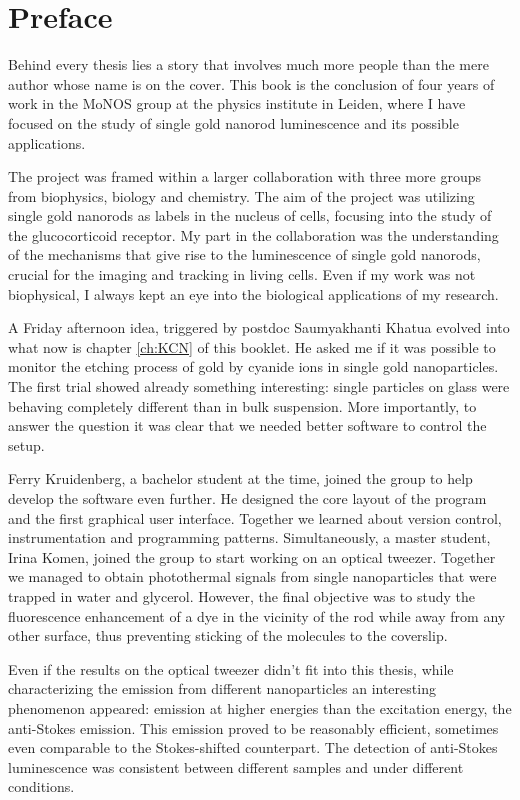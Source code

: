 \chapter*{Preface}

Behind every thesis lies a story that involves much more people than the
mere author whose name is on the cover. This book is the conclusion of four years of
work in the MoNOS group at the physics institute in Leiden, where I have focused
on the study of single gold nanorod luminescence and its possible applications. 

The project was framed within a larger collaboration with three more groups from
biophysics, biology and chemistry. The aim of the project was utilizing single
gold nanorods as labels in the nucleus of cells, focusing into the study of the
glucocorticoid receptor. My part in the collaboration was the understanding of
the mechanisms that give rise to the luminescence of single gold nanorods,
crucial for the imaging and tracking in living cells. Even if my work was not
biophysical, I always kept an eye into the biological applications of my
research.

A Friday afternoon idea, triggered by postdoc Saumyakhanti Khatua evolved into
what now is chapter \ref{ch:KCN} of this booklet. He asked me if it was possible
to monitor the etching process of gold by cyanide ions in single gold
nanoparticles. The first trial showed already something interesting: single
particles on glass were behaving completely different than in bulk suspension.
More importantly, to answer the question it was clear that we needed better
software to control the setup.

Ferry Kruidenberg, a bachelor student at the time, joined the group to help
develop the software even further. He designed the core layout of the program
and the first graphical user interface. Together we learned about version
control, instrumentation and programming patterns. Simultaneously, a master
student, Irina Komen, joined the group to start working on an optical tweezer.
Together we managed to obtain photothermal signals from single nanoparticles
that were trapped in water and glycerol. However, the final objective was to
study the fluorescence enhancement of a dye in the vicinity of the rod while
away from any other surface, thus preventing sticking of the molecules to the
coverslip.

Even if the results on the optical tweezer didn't fit into this thesis, while
characterizing the emission from different nanoparticles an interesting
phenomenon appeared: emission at higher energies than the excitation energy, the
anti-Stokes emission. This emission proved to be reasonably efficient, sometimes
even comparable to the Stokes-shifted counterpart. The detection of anti-Stokes
luminescence was consistent between different samples and under different
conditions.

